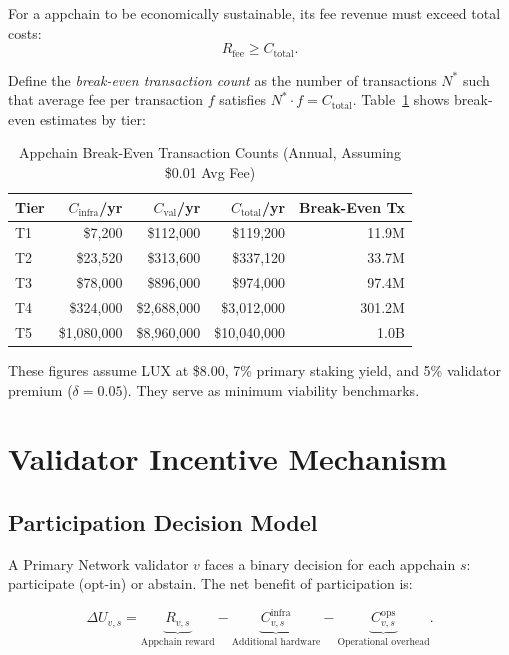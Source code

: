 \documentclass[11pt]{article}
\begin{document}
For a appchain to be economically sustainable, its fee revenue must exceed total costs:
\[
  R_{\text{fee}} \geq C_{\text{total}}.
\]

Define the \emph{break-even transaction count} as the number of transactions $N^*$
such that average fee per transaction $f$ satisfies $N^* \cdot f = C_{\text{total}}$.
Table~\ref{tab:breakeven} shows break-even estimates by tier:

\begin{table}[H]
\centering
\caption{Appchain Break-Even Transaction Counts (Annual, Assuming \$0.01 Avg Fee)}
\label{tab:breakeven}
\begin{tabular}{lrrrr}
\toprule
\textbf{Tier} & \textbf{$C_\text{infra}$/yr} & \textbf{$C_\text{val}$/yr} & \textbf{$C_\text{total}$/yr} & \textbf{Break-Even Tx} \\
\midrule
T1 & \$7,200 & \$112,000 & \$119,200 & 11.9M \\
T2 & \$23,520 & \$313,600 & \$337,120 & 33.7M \\
T3 & \$78,000 & \$896,000 & \$974,000 & 97.4M \\
T4 & \$324,000 & \$2,688,000 & \$3,012,000 & 301.2M \\
T5 & \$1,080,000 & \$8,960,000 & \$10,040,000 & 1.0B \\
\bottomrule
\end{tabular}
\end{table}

These figures assume LUX at \$8.00, 7\% primary staking yield, and 5\% validator premium
($\delta = 0.05$). They serve as minimum viability benchmarks.

\section{Validator Incentive Mechanism}
\label{sec:validators}

\subsection{Participation Decision Model}

A Primary Network validator $v$ faces a binary decision for each appchain $s$:
participate (opt-in) or abstain. The net benefit of participation is:

\[
  \Delta U_{v,s} = \underbrace{R_{v,s}}_{\text{Appchain reward}} - \underbrace{C_{v,s}^{\text{infra}}}_{\text{Additional hardware}} - \underbrace{C_{v,s}^{\text{ops}}}_{\text{Operational overhead}}.
\]
\end{document}
